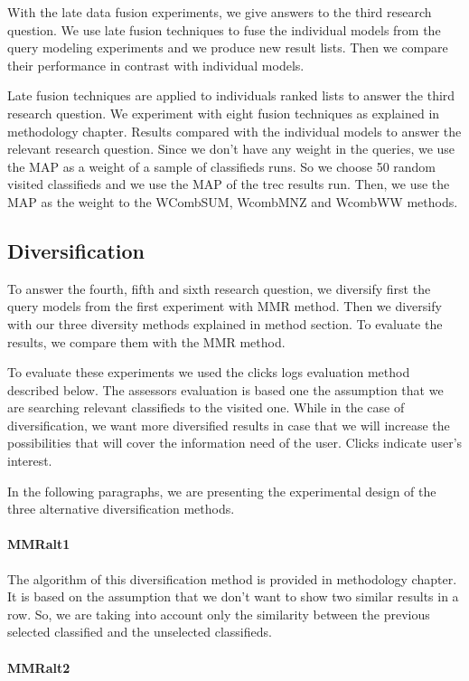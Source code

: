 With the late data fusion experiments, we give answers to the third research question. We use late fusion techniques to fuse the individual models from the query modeling experiments and we produce new result lists. Then we compare their performance in contrast with individual models.


Late fusion techniques are applied to individuals ranked lists to answer the third research question. We experiment with eight fusion techniques as explained in methodology chapter. Results compared with the individual models to answer the relevant research question. Since we don't have any weight in the queries, we use the MAP as a weight of a sample of classifieds runs. So we choose 50 random visited classifieds and we use the MAP of the trec results run. Then, we use the MAP as the weight to the WCombSUM, WcombMNZ and WcombWW methods.

\subsection{Diversification}
To answer the fourth, fifth and sixth research question, we diversify first the query models from the first experiment with MMR method. Then we diversify with our three diversity methods explained in method section. To evaluate the results, we compare them with the MMR method.

To evaluate these experiments we used the clicks logs evaluation method described below. The assessors evaluation is based one the assumption that we are searching relevant classifieds to the visited one. While in the case of diversification, we want more diversified results in case that we will increase the possibilities that will cover the information need of the user. Clicks indicate user's interest.

In the following paragraphs, we are presenting the experimental design of the three alternative diversification methods.

 \paragraph{MMRalt1}

The algorithm of this diversification method is provided in methodology chapter. It is based on the assumption that we don't want to show two similar results in a row. So, we are taking into account only the similarity between the previous selected classified and the unselected classifieds.

 \paragraph{MMRalt2}

